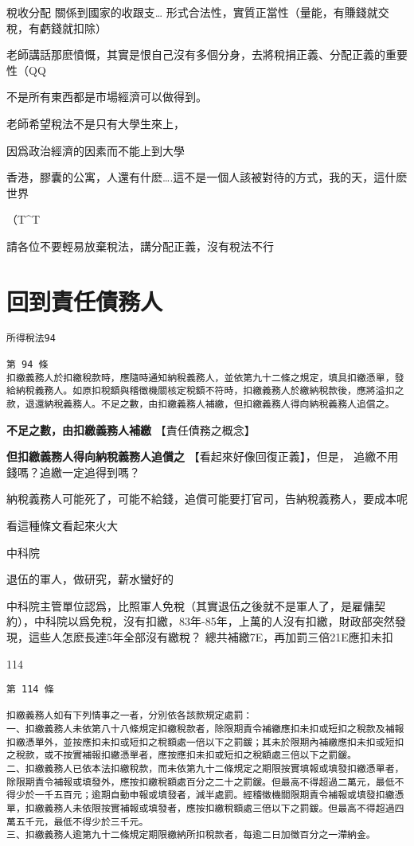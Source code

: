 \documentclass[]{ctexbook}
\begin{document}
稅收分配 關係到國家的收跟支\ldots{}
形式合法性，實質正當性（量能，有賺錢就交稅，有虧錢就扣除）

老師講話那麽憤慨，其實是恨自己沒有多個分身，去將稅捐正義、分配正義的重要性（QQ

不是所有東西都是市場經濟可以做得到。

老師希望稅法不是只有大學生來上，

因爲政治經濟的因素而不能上到大學

香港，膠囊的公寓，人還有什麽\ldots.這不是一個人該被對待的方式，我的天，這什麽世界

（T\^{}T

請各位不要輕易放棄稅法，講分配正義，沒有稅法不行

\hypertarget{ux56deux5230ux8cacux4efbux50b5ux52d9ux4eba}{%
\section{回到責任債務人}\label{ux56deux5230ux8cacux4efbux50b5ux52d9ux4eba}}

\begin{verbatim}
所得稅法94

第 94 條
扣繳義務人於扣繳稅款時，應隨時通知納稅義務人，並依第九十二條之規定，填具扣繳憑單，發給納稅義務人。如原扣稅額與稽徵機關核定稅額不符時，扣繳義務人於繳納稅款後，應將溢扣之款，退還納稅義務人。不足之數，由扣繳義務人補繳，但扣繳義務人得向納稅義務人追償之。
\end{verbatim}

\textbf{不足之數，由扣繳義務人補繳}
【責任債務之概念】

\textbf{但扣繳義務人得向納稅義務人追償之}
【看起來好像回復正義】，但是，
追繳不用錢嗎？追繳一定追得到嗎？

納稅義務人可能死了，可能不給錢，追償可能要打官司，告納稅義務人，要成本呢

看這種條文看起來火大

中科院

退伍的軍人，做研究，薪水蠻好的

中科院主管單位認爲，比照軍人免稅（其實退伍之後就不是軍人了，是雇傭契約），中科院以爲免稅，沒有扣繳，83年-85年，上萬的人沒有扣繳，財政部突然發現，這些人怎麽長達5年全部沒有繳稅？
總共補繳7E，再加罰三倍21E應扣未扣

114

\begin{verbatim}
第 114 條

扣繳義務人如有下列情事之一者，分別依各該款規定處罰：
一、扣繳義務人未依第八十八條規定扣繳稅款者，除限期責令補繳應扣未扣或短扣之稅款及補報扣繳憑單外，並按應扣未扣或短扣之稅額處一倍以下之罰鍰；其未於限期內補繳應扣未扣或短扣之稅款，或不按實補報扣繳憑單者，應按應扣未扣或短扣之稅額處三倍以下之罰鍰。
二、扣繳義務人已依本法扣繳稅款，而未依第九十二條規定之期限按實填報或填發扣繳憑單者，除限期責令補報或填發外，應按扣繳稅額處百分之二十之罰鍰。但最高不得超過二萬元，最低不得少於一千五百元；逾期自動申報或填發者，減半處罰。經稽徵機關限期責令補報或填發扣繳憑單，扣繳義務人未依限按實補報或填發者，應按扣繳稅額處三倍以下之罰鍰。但最高不得超過四萬五千元，最低不得少於三千元。
三、扣繳義務人逾第九十二條規定期限繳納所扣稅款者，每逾二日加徵百分之一滯納金。
\end{verbatim}
\end{document}
